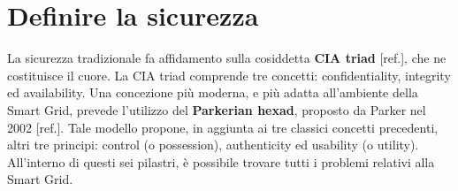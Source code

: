 \section{Definire la sicurezza}
La sicurezza tradizionale fa affidamento sulla cosiddetta \textbf{CIA triad} [ref.], che ne costituisce il cuore. La CIA triad comprende tre concetti: confidentiality, integrity ed availability. \newline Una concezione più moderna, e più adatta all'ambiente della Smart Grid, prevede l'utilizzo del \textbf{Parkerian hexad}, proposto da Parker nel 2002 [ref.]. Tale modello propone, in aggiunta ai tre classici concetti precedenti, altri tre principi: control (o possession), authenticity ed usability (o utility). \newline All'interno di questi sei pilastri, è possibile trovare tutti i problemi relativi alla Smart Grid.
\begin{figure}[h]
\end{figure}
